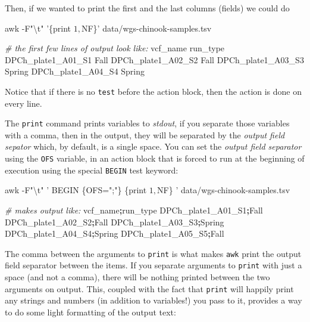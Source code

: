 \documentclass[]{krantz}
\makeatletter
\newenvironment{Shaded}{\begin{snugshade}}{\end{snugshade}}
\newcommand{\CommentTok}[1]{\textcolor[rgb]{0.37,0.37,0.37}{\textit{#1}}}
\newcommand{\ExtensionTok}[1]{#1}
\newcommand{\FunctionTok}[1]{\textcolor[rgb]{0,0,0}{#1}}
\newcommand{\KeywordTok}[1]{\textcolor[rgb]{0.27,0.27,0.27}{\textbf{#1}}}
\newcommand{\NormalTok}[1]{#1}
\newcommand{\StringTok}[1]{\textcolor[rgb]{0.5,0.5,0.5}{#1}}
\newenvironment{kframe}{%
\medskip{}
\setlength{\fboxsep}{.8em}
 \def\at@end@of@kframe{}%
 \ifinner\ifhmode%
  \def\at@end@of@kframe{\end{minipage}}%
  \begin{minipage}{\columnwidth}%
 \fi\fi%
 \def\FrameCommand##1{\hskip\@totalleftmargin \hskip-\fboxsep
 \colorbox{shadecolor}{##1}\hskip-\fboxsep
     \hskip-\linewidth \hskip-\@totalleftmargin \hskip\columnwidth}%
 \MakeFramed {\advance\hsize-\width
   \@totalleftmargin\z@ \linewidth\hsize
   \@setminipage}}%
 {\par\unskip\endMakeFramed%
 \at@end@of@kframe}
\renewenvironment{Shaded}{\begin{kframe}}{\end{kframe}}
\makeatother
\begin{document}
Then, if we wanted to print the first and the last columns (fields) we could do

\begin{Shaded}
\begin{Highlighting}[]
\FunctionTok{awk}\NormalTok{ -F}\StringTok{"\textbackslash{}t"} \StringTok{'\{print $1, $NF\}'}\NormalTok{ data/wgs-chinook-samples.tsv}

\CommentTok{# the first few lines of output look like:}
\ExtensionTok{vcf_name}\NormalTok{ run_type}
\ExtensionTok{DPCh_plate1_A01_S1}\NormalTok{ Fall}
\ExtensionTok{DPCh_plate1_A02_S2}\NormalTok{ Fall}
\ExtensionTok{DPCh_plate1_A03_S3}\NormalTok{ Spring}
\ExtensionTok{DPCh_plate1_A04_S4}\NormalTok{ Spring}
\end{Highlighting}
\end{Shaded}

Notice that if there is no \texttt{test} before the action block, then the action is
done on every line.

The \texttt{print} command prints variables to \emph{stdout}, if you separate those variables with
a comma, then in the output, they will be separated by the \emph{output field sepator} which,
by default, is a single space. You can set the \emph{output field separator} using the \texttt{OFS}
variable, in an action block that is forced to run at the beginning of execution using the
special \texttt{BEGIN} test keyword:

\begin{Shaded}
\begin{Highlighting}[]
\FunctionTok{awk}\NormalTok{ -F}\StringTok{"\textbackslash{}t"} \StringTok{'}
\StringTok{  BEGIN \{OFS=";"\}}
\StringTok{  \{print $1, $NF\}}
\StringTok{'}\NormalTok{ data/wgs-chinook-samples.tsv}

\CommentTok{# makes output like:}
\ExtensionTok{vcf_name}\KeywordTok{;}\ExtensionTok{run_type}
\ExtensionTok{DPCh_plate1_A01_S1}\KeywordTok{;}\ExtensionTok{Fall}
\ExtensionTok{DPCh_plate1_A02_S2}\KeywordTok{;}\ExtensionTok{Fall}
\ExtensionTok{DPCh_plate1_A03_S3}\KeywordTok{;}\ExtensionTok{Spring}
\ExtensionTok{DPCh_plate1_A04_S4}\KeywordTok{;}\ExtensionTok{Spring}
\ExtensionTok{DPCh_plate1_A05_S5}\KeywordTok{;}\ExtensionTok{Fall}
\end{Highlighting}
\end{Shaded}

The comma between the arguments to \texttt{print} is what makes \texttt{awk} print the output field
separator between the items. If you
separate arguments to \texttt{print} with just a space (and not a comma), there will be nothing
printed between the two arguments on output. This, coupled with the fact that
\texttt{print} will happily print any strings and numbers (in addition to variables!) you pass to it,
provides a way to do some light formatting of the output text:
\end{document}
